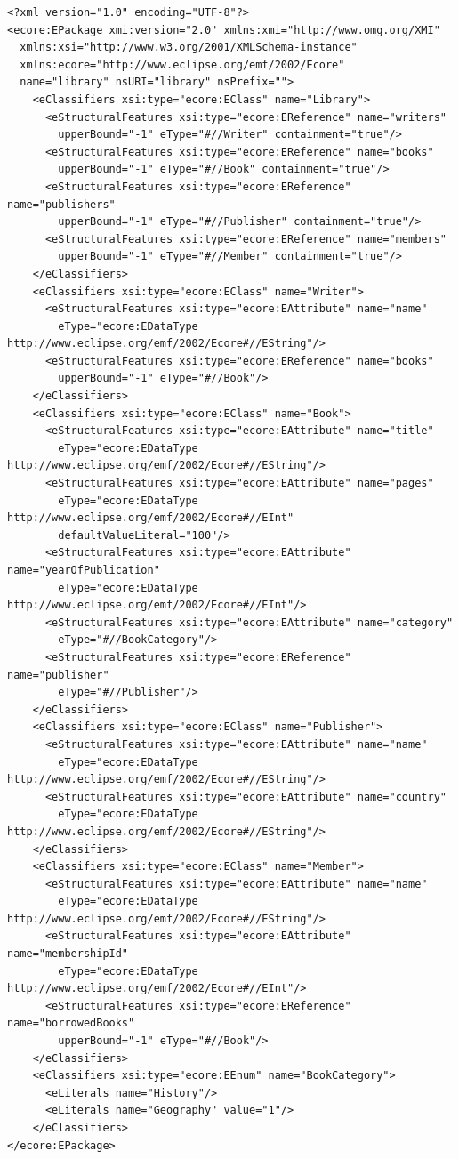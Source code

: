 \documentclass[11pt]{article}
\begin{document}
\begin{lstlisting}[caption={Ejemplo de modelo Ecore serializado en XMI.},label={lst:modelo-xmi},basicstyle=\ttfamily\scriptsize]
<?xml version="1.0" encoding="UTF-8"?>
<ecore:EPackage xmi:version="2.0" xmlns:xmi="http://www.omg.org/XMI"
  xmlns:xsi="http://www.w3.org/2001/XMLSchema-instance"
  xmlns:ecore="http://www.eclipse.org/emf/2002/Ecore"
  name="library" nsURI="library" nsPrefix="">
    <eClassifiers xsi:type="ecore:EClass" name="Library">
      <eStructuralFeatures xsi:type="ecore:EReference" name="writers"
        upperBound="-1" eType="#//Writer" containment="true"/>
      <eStructuralFeatures xsi:type="ecore:EReference" name="books"
        upperBound="-1" eType="#//Book" containment="true"/>
      <eStructuralFeatures xsi:type="ecore:EReference" name="publishers"
        upperBound="-1" eType="#//Publisher" containment="true"/>
      <eStructuralFeatures xsi:type="ecore:EReference" name="members"
        upperBound="-1" eType="#//Member" containment="true"/>
    </eClassifiers>
    <eClassifiers xsi:type="ecore:EClass" name="Writer">
      <eStructuralFeatures xsi:type="ecore:EAttribute" name="name"
        eType="ecore:EDataType http://www.eclipse.org/emf/2002/Ecore#//EString"/>
      <eStructuralFeatures xsi:type="ecore:EReference" name="books"
        upperBound="-1" eType="#//Book"/>
    </eClassifiers>
    <eClassifiers xsi:type="ecore:EClass" name="Book">
      <eStructuralFeatures xsi:type="ecore:EAttribute" name="title"
        eType="ecore:EDataType http://www.eclipse.org/emf/2002/Ecore#//EString"/>
      <eStructuralFeatures xsi:type="ecore:EAttribute" name="pages"
        eType="ecore:EDataType http://www.eclipse.org/emf/2002/Ecore#//EInt"
        defaultValueLiteral="100"/>
      <eStructuralFeatures xsi:type="ecore:EAttribute" name="yearOfPublication"
        eType="ecore:EDataType http://www.eclipse.org/emf/2002/Ecore#//EInt"/>
      <eStructuralFeatures xsi:type="ecore:EAttribute" name="category"
        eType="#//BookCategory"/>
      <eStructuralFeatures xsi:type="ecore:EReference" name="publisher"
        eType="#//Publisher"/>
    </eClassifiers>
    <eClassifiers xsi:type="ecore:EClass" name="Publisher">
      <eStructuralFeatures xsi:type="ecore:EAttribute" name="name"
        eType="ecore:EDataType http://www.eclipse.org/emf/2002/Ecore#//EString"/>
      <eStructuralFeatures xsi:type="ecore:EAttribute" name="country"
        eType="ecore:EDataType http://www.eclipse.org/emf/2002/Ecore#//EString"/>
    </eClassifiers>
    <eClassifiers xsi:type="ecore:EClass" name="Member">
      <eStructuralFeatures xsi:type="ecore:EAttribute" name="name"
        eType="ecore:EDataType http://www.eclipse.org/emf/2002/Ecore#//EString"/>
      <eStructuralFeatures xsi:type="ecore:EAttribute" name="membershipId"
        eType="ecore:EDataType http://www.eclipse.org/emf/2002/Ecore#//EInt"/>
      <eStructuralFeatures xsi:type="ecore:EReference" name="borrowedBooks"
        upperBound="-1" eType="#//Book"/>
    </eClassifiers>
    <eClassifiers xsi:type="ecore:EEnum" name="BookCategory">
      <eLiterals name="History"/>
      <eLiterals name="Geography" value="1"/>
    </eClassifiers>
</ecore:EPackage>
\end{lstlisting}
\end{document}
